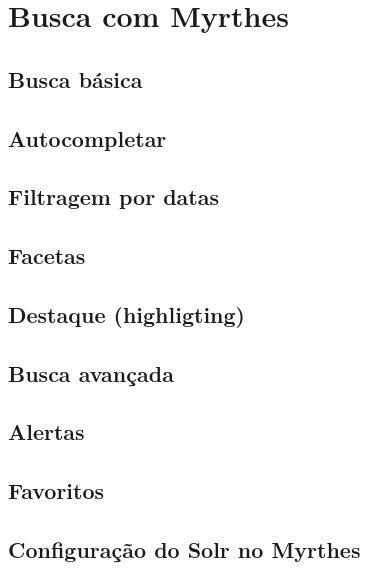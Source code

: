 \documentclass[]{book}
\begin{document}
\hypertarget{busca}{%
\chapter{Busca com Myrthes}\label{busca}}

\hypertarget{busca-basica}{%
\section{Busca básica}\label{busca-basica}}

\hypertarget{autocompletar}{%
\section{Autocompletar}\label{autocompletar}}

\hypertarget{filtragem-por-datas}{%
\section{Filtragem por datas}\label{filtragem-por-datas}}

\hypertarget{facetas}{%
\section{Facetas}\label{facetas}}

\hypertarget{destaque-highligting}{%
\section{Destaque (highligting)}\label{destaque-highligting}}

\hypertarget{busca-avancada}{%
\section{Busca avançada}\label{busca-avancada}}

\hypertarget{alertas}{%
\section{Alertas}\label{alertas}}

\hypertarget{favoritos}{%
\section{Favoritos}\label{favoritos}}

\hypertarget{configuracao-do-solr-no-myrthes}{%
\section{Configuração do Solr no Myrthes}\label{configuracao-do-solr-no-myrthes}}
\end{document}
